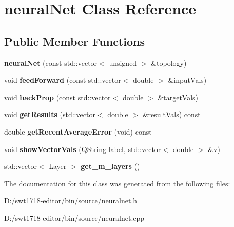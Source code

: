 \hypertarget{classneural_net}{}\section{neural\+Net Class Reference}
\label{classneural_net}
\subsection*{Public Member Functions}
\begin{DoxyCompactItemize}
\item 
\mbox{\label{classneural_net_ad34445961921d865df2ca41036748340}} 
{\bfseries neural\+Net} (const std\+::vector$<$ unsigned $>$ \&topology)
\item 
\mbox{\label{classneural_net_a9a6385551109fcc1f0fb7d16eb972427}} 
void {\bfseries feed\+Forward} (const std\+::vector$<$ double $>$ \&input\+Vals)
\item 
\mbox{\label{classneural_net_a679d9db585392bc7bec6b304bc13af4f}} 
void {\bfseries back\+Prop} (const std\+::vector$<$ double $>$ \&target\+Vals)
\item 
\mbox{\label{classneural_net_ad1ab8818ccbb8af254caf6df91576326}} 
void {\bfseries get\+Results} (std\+::vector$<$ double $>$ \&result\+Vals) const
\item 
\mbox{\label{classneural_net_aa75301e500b7cae1dd3506388d2edd3d}} 
double {\bfseries get\+Recent\+Average\+Error} (void) const
\item 
\mbox{\label{classneural_net_af9ff1464ecd7b2ad766d42ed78cc46c5}} 
void {\bfseries show\+Vector\+Vals} (Q\+String label, std\+::vector$<$ double $>$ \&v)
\item 
\mbox{\label{classneural_net_af855a7772e383425d39e5e3783f4a950}} 
std\+::vector$<$ Layer $>$ {\bfseries get\+\_\+m\+\_\+layers} ()
\end{DoxyCompactItemize}


The documentation for this class was generated from the following files\+:\begin{DoxyCompactItemize}
\item 
D\+:/swt1718-\/editor/bin/source/neuralnet.\+h\item 
D\+:/swt1718-\/editor/bin/source/neuralnet.\+cpp\end{DoxyCompactItemize}
